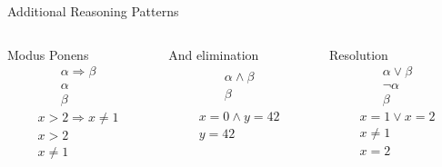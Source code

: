 \documentclass[14pt]{beamer}
\newcommand{\limpl}{\Rightarrow}
\begin{document}
\begin{frame}{Additional Reasoning Patterns}
\begin{columns}[T]
\begin{column}{0.31\textwidth}
\begin{block}{Modus Ponens}
\[
\begin{array}{l}
\alpha \limpl \beta \\
\alpha \\
\hline
\beta
\end{array}
\]
\bigskip
\[
\begin{array}{l}
x > 2 \limpl x \neq 1 \\
x > 2 \\
\hline
x \neq 1
\end{array}
\]
\end{block}
\end{column}
\pause
\begin{column}{0.31\textwidth}
\begin{block}{And elimination}
\[
\begin{array}{l}
\\
\alpha \land \beta \\
\hline
\beta
\end{array}
\]
\bigskip
\[
\begin{array}{l}
\\
x = 0 \land y = 42 \\
\hline
y = 42
\end{array}
\]
\end{block}
\end{column}
\pause
\begin{column}{0.31\textwidth}
\begin{block}{Resolution}
\[
\begin{array}{l}
\alpha \lor \beta \\
\lnot\alpha \\
\hline
\beta
\end{array}
\]
\bigskip
\[
\begin{array}{l}
x = 1 \lor x = 2 \\
x \neq 1 \\
\hline
x = 2
\end{array}
\]
\end{block}
\end{column}
\end{columns}
\end{frame}
\end{document}
